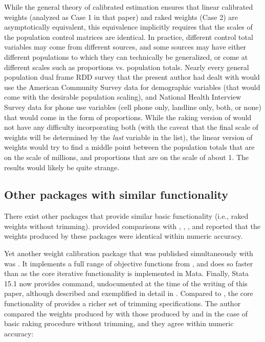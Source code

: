 
While the general theory of calibrated estimation \citep{deville:sarndal:1992}
ensures that linear calibrated weights (analyzed as Case 1 in that paper) and
raked weights (Case 2) are asymptotically equivalent, this equivalence implicitly
requires that the scales of the population control matrices are identical.
In practice, different control total variables may come from different sources,
and some sources may have either different populations to which they can technically
be generalized, or come at different scales such as proportions vs. population totals.
Nearly every general population dual frame RDD survey that the present author had dealt
with would use the American Community Survey data for demographic variables
(that would come with the desirable population scaling), and National Health Interview Survey
data for phone use variables (cell phone only, landline only, both, or none) that would
come in the form of proportions. While the raking version of  would not
have any difficulty incorporating both (with the caveat that the final scale of weights
will be determined by the \textit{last} variable in the  list),
the linear version of weights would try to find a middle point between the population
totals that are on the scale of millions, and proportions that are on the scale of about 1.
The results would likely be quite strange.

\subsection{Other packages with similar functionality}
\label{subsec:compare}

There exist other packages that provide similar basic functionality
(i.e., raked weights without trimming).
\citet{kolenikov:2014} provided comparisons with
 \citep{winter:2002},  \citep{bergmann:2011},
 \citep{wittenberg:2010}, and reported that the weights
produced by these packages were identical within numeric accuracy.

Yet another weight calibration
package that was published simultaneously with \citet{kolenikov:2014}
was  \citep{pacifico:2014}. It implements a full range
of objective functions from \citet{deville:sarndal:1992}, and does so faster
than  as the core iterative functionality is implemented in Mata.
Finally, Stata 15.1 now provides  command,
undocumented at the time of the writing of this paper, although described
and exemplified in detail in \citet{valliant:dever:2017}. Compared
to , the core functionality of  provides
a richer set of trimming specifications. The author compared the weights
produced by  with those produced by 
and 
in the case of basic raking procedure without trimming, and they agree within
numeric accuracy:

